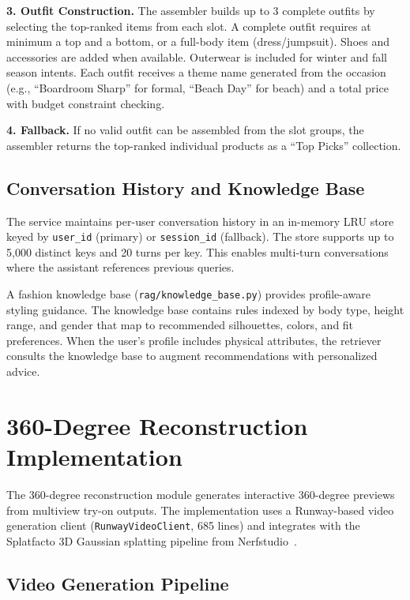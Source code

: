 \textbf{3. Outfit Construction.} The assembler builds up to 3 complete outfits by selecting the top-ranked items from each slot. A complete outfit requires at minimum a top and a bottom, or a full-body item (dress/jumpsuit). Shoes and accessories are added when available. Outerwear is included for winter and fall season intents. Each outfit receives a theme name generated from the occasion (e.g., ``Boardroom Sharp'' for formal, ``Beach Day'' for beach) and a total price with budget constraint checking.

\textbf{4. Fallback.} If no valid outfit can be assembled from the slot groups, the assembler returns the top-ranked individual products as a ``Top Picks'' collection.

\subsection{Conversation History and Knowledge Base}

The service maintains per-user conversation history in an in-memory LRU store keyed by \texttt{user\_id} (primary) or \texttt{session\_id} (fallback). The store supports up to 5,000 distinct keys and 20 turns per key. This enables multi-turn conversations where the assistant references previous queries.

A fashion knowledge base (\texttt{rag/knowledge\_base.py}) provides profile-aware styling guidance. The knowledge base contains rules indexed by body type, height range, and gender that map to recommended silhouettes, colors, and fit preferences. When the user's profile includes physical attributes, the retriever consults the knowledge base to augment recommendations with personalized advice.

\section{360-Degree Reconstruction Implementation}
\label{sec:impl-360}

The 360-degree reconstruction module generates interactive 360-degree previews from multiview try-on outputs. The implementation uses a Runway-based video generation client (\texttt{RunwayVideoClient}, 685 lines) and integrates with the Splatfacto 3D Gaussian splatting pipeline from Nerfstudio~\cite{tancik2023nerfstudio}.

\subsection{Video Generation Pipeline}

